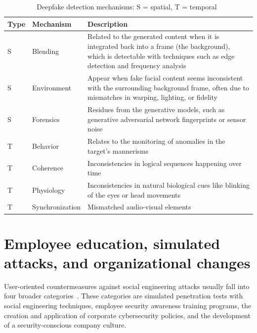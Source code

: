 \begin{table}[ht!]  
\centering
\renewcommand{\arraystretch}{1.5} %
\setlength{\tabcolsep}{5pt} %
\begin{tabularx}{\textwidth}{|l|l|X|} %
\hline  
\textbf{Type} & \textbf{Mechanism} & \textbf{Description} \\ \hline  
S & Blending & Related to the generated content when it is integrated back into a frame (the background), which is detectable with techniques such as edge detection and frequency analysis \\ \hline  
S & Environment & Appear when fake facial content seems inconsistent
with the surrounding background frame, often due to mismatches in warping, lighting, or
fidelity \\ \hline  
S & Forensics & Residues from the generative models, such as generative
adversarial network fingerprints or sensor noise \\ \hline  
T & Behavior & Relates to the monitoring of anomalies in the target’s mannerisms \\ \hline  
T & Coherence & Inconsistencies in logical sequences
happening over time\\ \hline  
T & Physiology & Inconsistencies in natural biological cues like blinking of
the eyes or head movements \\ \hline  
T & Synchronization & Mismatched
audio-visual elements \\ \hline  
\end{tabularx}  
\caption{Deepfake detection mechanisms: S = spatial, T = temporal~\citep{mirsky_Creation_Detection_Deepfakes_2021}}  
\label{table:deepfake_artifacts}  
\end{table}  




\section{Employee education, simulated attacks, and organizational changes}

User-oriented countermeasures against social engineering attacks usually fall into four broader categories~\citep{tsinganos_Towards_Automated_Recognition_Chat_SE_Enterprise_2018, mitnick_The_Art_of_Deception_2003}. These categories are simulated penetration tests with social engineering techniques, employee security awareness training programs, the creation and application of corporate cybersecurity policies, and the development of a security-conscious company culture.

